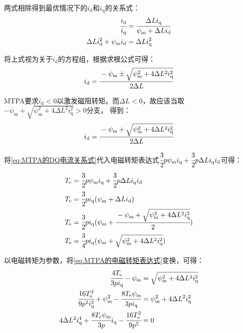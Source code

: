 两式相除得到最优情况下的\(i_{\mathrm{d}}\)和\(i_{\mathrm{q}}\)的关系式：
\begin{align*}
    \cfrac{i_{\mathrm{d}}}{i_{\mathrm{q}}}&=\cfrac{\Delta L i_{\mathrm{q}}}{\psi_{\mathrm{m}}+\Delta L i_{\mathrm{d}}}\\
    \Delta Li_{\mathrm{d}}^2+\psi_{\mathrm{m}}i_{\mathrm{d}}&=\Delta L i_{\mathrm{q}}^2
\end{align*}

将上式视为关于\(i_{\mathrm{d}}\)的方程组，根据求根公式可得：
\begin{equation*}
    i_{\mathrm{d}}=\cfrac{-\psi_{\mathrm{m}}\pm\sqrt{\psi_{\mathrm{m}}^2+4\Delta L^2 i_{\mathrm{q}}^2}}{2\Delta L}
\end{equation*}

MTPA要求\(i_{\mathrm{d}}<0\)以激发磁阻转矩。而\(\Delta L<0\)，故应该当取\(-\psi_{\mathrm{m}}+\sqrt{\psi_{\mathrm{m}}^2+4\Delta L^2 i_{\mathrm{q}}^2}>0\)分支，
得到：
\begin{equation}
    i_{\mathrm{d}}=\cfrac{-\psi_{\mathrm{m}}+\sqrt{\psi_{\mathrm{m}}^2+4\Delta L^2 i_{\mathrm{q}}^2}}{2\Delta L}
    \label{eq:MTPA的DQ电流关系式}
\end{equation}

将\eqref{eq:MTPA的DQ电流关系式}代入电磁转矩表达式\(\cfrac{3}{2}p\psi_{\mathrm{m}}i_{\mathrm{q}}+
\cfrac{3}{2}p\Delta Li_{\mathrm{q}}i_{\mathrm{d}}\)可得：
\begin{align}
    T_{\mathrm{e}}&=\cfrac{3}{2}p\psi_{\mathrm{m}}i_{\mathrm{q}}+\cfrac{3}{2}p\Delta Li_{\mathrm{q}}i_{\mathrm{d}}\notag\\
    T_{\mathrm{e}}&=\cfrac{3}{2}pi_{\mathrm{q}}(\psi_{\mathrm{m}}+\Delta L i_{\mathrm{d}})\notag\\
    T_{\mathrm{e}}&=\cfrac{3}{2}pi_{\mathrm{q}}(\psi_{\mathrm{m}}+\cfrac{-\psi_{\mathrm{m}}+\sqrt{\psi_{\mathrm{m}}^2+4\Delta L^2 i_{\mathrm{q}}^2}}{2})\notag\\
    T_{\mathrm{e}}&=\cfrac{3}{4}pi_{\mathrm{q}}(\psi_{\mathrm{m}}+\sqrt{\psi_{\mathrm{m}}^2+4\Delta L^2 i_{\mathrm{q}}^2})
    \label{eq:MTPA的电磁转矩表达式}
\end{align}

以电磁转矩为参数，将\eqref{eq:MTPA的电磁转矩表达式}变换，可得：
\begin{align*}
    \cfrac{4T_{\mathrm{e}}}{3pi_{\mathrm{q}}}-\psi_{\mathrm{m}}&=\sqrt{\psi_{\mathrm{m}}^2+4\Delta L^2 i_{\mathrm{q}}^2}\\
    \cfrac{16T_{\mathrm{e}}^2}{9p^2i_{\mathrm{q}}^2}+\psi_{\mathrm{m}}^2-\cfrac{8T_{\mathrm{e}}\psi_{\mathrm{m}}}{3pi_{\mathrm{q}}}&=\psi_{\mathrm{m}}^2+4\Delta L^2 i_{\mathrm{q}}^2\\
    4\Delta L^2i_{\mathrm{q}}^4+\cfrac{8T_{\mathrm{e}}\psi_{\mathrm{m}}}{3p}i_{\mathrm{q}}-\cfrac{16T_{\mathrm{e}}^2}{9p^2}&=0
\end{align*}

